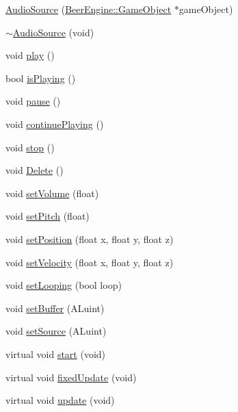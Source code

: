\begin{DoxyCompactItemize}
\item 
\mbox{\hyperlink{class_beer_engine_1_1_audio_1_1_audio_source_ae88acb0b42bec17ab0eb10c2b5a29296}{Audio\+Source}} (\mbox{\hyperlink{class_beer_engine_1_1_game_object}{Beer\+Engine\+::\+Game\+Object}} $\ast$game\+Object)
\item 
\mbox{\hyperlink{class_beer_engine_1_1_audio_1_1_audio_source_ab2c171ac2a239051dee8c22da0400683}{$\sim$\+Audio\+Source}} (void)
\item 
void \mbox{\hyperlink{class_beer_engine_1_1_audio_1_1_audio_source_a798250da977ddbbcc03ae35273a3386b}{play}} ()
\item 
bool \mbox{\hyperlink{class_beer_engine_1_1_audio_1_1_audio_source_af7acd0b50d499e9eb13ac649f5305acf}{is\+Playing}} ()
\item 
void \mbox{\hyperlink{class_beer_engine_1_1_audio_1_1_audio_source_a22271d00e2c9f6afded752b941fb35de}{pause}} ()
\item 
void \mbox{\hyperlink{class_beer_engine_1_1_audio_1_1_audio_source_a26d38a9a6e504074b9819416f4c9fa81}{continue\+Playing}} ()
\item 
void \mbox{\hyperlink{class_beer_engine_1_1_audio_1_1_audio_source_a7885411b2161b1b0f4bfbd87a97cd899}{stop}} ()
\item 
void \mbox{\hyperlink{class_beer_engine_1_1_audio_1_1_audio_source_ae1a09dee4b97025ef4506897c2eb3979}{Delete}} ()
\item 
void \mbox{\hyperlink{class_beer_engine_1_1_audio_1_1_audio_source_a0a31f1aaf01219860cc6aeb7a3fe1619}{set\+Volume}} (float)
\item 
void \mbox{\hyperlink{class_beer_engine_1_1_audio_1_1_audio_source_a4675732a9f75a2677a3f5d7b1a5b8beb}{set\+Pitch}} (float)
\item 
void \mbox{\hyperlink{class_beer_engine_1_1_audio_1_1_audio_source_a54f71bf26922c72815c892b7dc9c24b6}{set\+Position}} (float x, float y, float z)
\item 
void \mbox{\hyperlink{class_beer_engine_1_1_audio_1_1_audio_source_ae20d8df89f102910ed78acc2937a8433}{set\+Velocity}} (float x, float y, float z)
\item 
void \mbox{\hyperlink{class_beer_engine_1_1_audio_1_1_audio_source_aaab040b49f057f03f75be7dad2980ef0}{set\+Looping}} (bool loop)
\item 
void \mbox{\hyperlink{class_beer_engine_1_1_audio_1_1_audio_source_a4e8bd4f802eed9ee3cca487ec01e584e}{set\+Buffer}} (A\+Luint)
\item 
void \mbox{\hyperlink{class_beer_engine_1_1_audio_1_1_audio_source_a37789c76130d45e6e6c807e5297e7ee7}{set\+Source}} (A\+Luint)
\item 
virtual void \mbox{\hyperlink{class_beer_engine_1_1_audio_1_1_audio_source_aa50a60f2ff5540c9e4506b0ae001c98e}{start}} (void)
\item 
virtual void \mbox{\hyperlink{class_beer_engine_1_1_audio_1_1_audio_source_a248900a46e559e0e085b2cb98a766cf2}{fixed\+Update}} (void)
\item 
virtual void \mbox{\hyperlink{class_beer_engine_1_1_audio_1_1_audio_source_aaf476320ad96ecb33951f349f5112c54}{update}} (void)
\end{DoxyCompactItemize}
